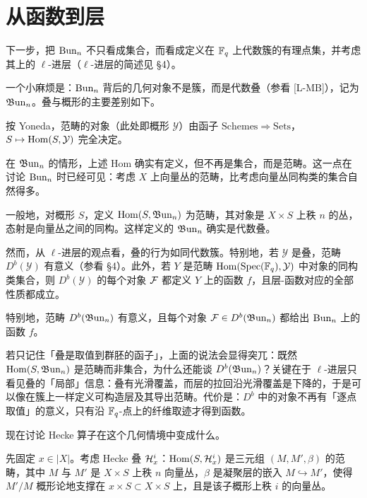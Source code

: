 \section{从函数到层}

下一步，把 $\operatorname{Bun}_n$ 不只看成集合，而看成定义在 $\mathbb{F}_q$ 上代数簇的有理点集，并考虑其上的 $\ell$-进层（$\ell$-进层的简述见 \S4）。

一个小麻烦是：$\operatorname{Bun}_n$ 背后的几何对象不是簇，而是代数叠（参看 [L-MB]），记为 $\mathfrak{B}\mathrm{un}_n$。叠与概形的主要差别如下。

按 Yoneda，范畴的对象（此处即概形 $\mathcal{Y}$）由函子 $\mathrm{Schemes}\Rightarrow\mathrm{Sets}$，$S\mapsto\operatorname{Hom}(S,\mathcal{Y})$ 完全决定。

在 $\mathfrak{B}\mathrm{un}_n$ 的情形，上述 Hom 确实有定义，但不再是集合，而是范畴。这一点在讨论 $\operatorname{Bun}_n$ 时已经可见：考虑 $X$ 上向量丛的范畴，比考虑向量丛同构类的集合自然得多。

一般地，对概形 $S$，定义 $\operatorname{Hom}(S,\mathfrak{B}\mathrm{un}_n)$ 为范畴，其对象是 $X\times S$ 上秩 $n$ 的丛，态射是向量丛之间的同构。这样定义的 $\mathfrak{B}\mathrm{un}_n$ 确实是代数叠。

然而，从 $\ell$-进层的观点看，叠的行为如同代数簇。特别地，若 $\mathcal{Y}$ 是叠，范畴 $D^b(\mathcal{Y})$ 有意义（参看 \S4）。此外，若 $Y$ 是范畴 $\operatorname{Hom}(\operatorname{Spec}(\mathbb{F}_q),\mathcal{Y})$ 中对象的同构类集合，则 $D^b(\mathcal{Y})$ 的每个对象 $\mathcal{F}$ 都定义 $Y$ 上的函数 $f$，且层-函数对应的全部性质都成立。

特别地，范畴 $D^b(\mathfrak{B}\mathrm{un}_n)$ 有意义，且每个对象 $\mathcal{F}\in D^b(\mathfrak{B}\mathrm{un}_n)$ 都给出 $\operatorname{Bun}_n$ 上的函数 $f$。

\begin{annote}
若只记住「叠是取值到群胚的函子」，上面的说法会显得突兀：既然 $\operatorname{Hom}(S,\mathfrak{B}\mathrm{un}_n)$ 是范畴而非集合，为什么还能谈 $D^b(\mathfrak{B}\mathrm{un}_n)$？关键在于 $\ell$-进层只看见叠的「局部」信息：叠有光滑覆盖，而层的拉回沿光滑覆盖是下降的，于是可以像在簇上一样定义可构造层及其导出范畴。代价是：$D^b$ 中的对象不再有「逐点取值」的意义，只有沿 $\mathbb{F}_q$-点上的纤维取迹才得到函数。\par{}
\end{annote}

现在讨论 Hecke 算子在这个几何情境中变成什么。

先固定 $x\in|X|$。考虑 Hecke 叠 $\mathcal{H}_x^i$：$\operatorname{Hom}(S,\mathcal{H}_x^i)$ 是三元组 $(M,M',\beta)$ 的范畴，其中 $M$ 与 $M'$ 是 $X\times S$ 上秩 $n$ 向量丛，$\beta$ 是凝聚层的嵌入 $M\hookrightarrow M'$，使得 $M'/M$ 概形论地支撑在 $x\times S\subset X\times S$ 上，且是该子概形上秩 $i$ 的向量丛。

